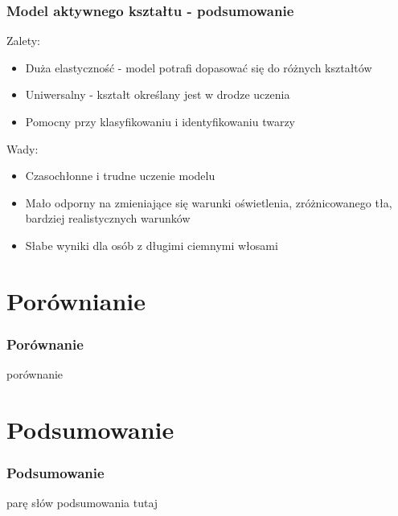 \documentclass[xcolor=table]{beamer}
\begin{document}
\begin{frame}
  \frametitle{Model aktywnego kształtu - podsumowanie}
    { Zalety:
\begin{itemize}
\item Duża elastyczność - model potrafi dopasować się do różnych kształtów
\item Uniwersalny - kształt określany jest w drodze uczenia
\item Pomocny przy klasyfikowaniu i identyfikowaniu twarzy
\end{itemize}
}
   {\noindent 
Wady:
\begin{itemize}
\item  Czasochłonne i trudne uczenie modelu 
\item  Mało odporny na zmieniające się warunki oświetlenia, zróżnicowanego tła, bardziej realistycznych warunków
\item  Słabe wyniki dla osób z długimi ciemnymi włosami
\end{itemize}}
\end{frame}

\section{Porównianie}

\begin{frame}
  \frametitle{Porównanie}

  porównanie

\end{frame}

\section{Podsumowanie}

\begin{frame}
  \frametitle{Podsumowanie}

  parę słów podsumowania tutaj

\end{frame}
\end{document}
